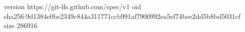 version https://git-lfs.github.com/spec/v1
oid sha256:9d1384e0be2349c844a311771ccb991af7900992ea5ef74bee2dd5b8bd5031cf
size 286916
